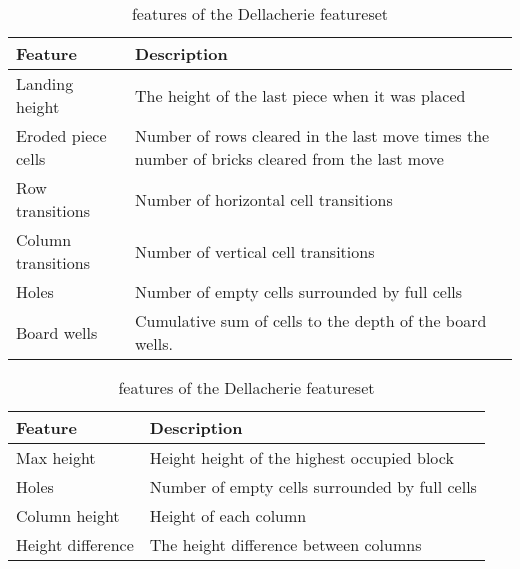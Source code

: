 \begin{table}[h!]
\begin{center}
\begin{tabular}{| l | p{8cm} |}
\hline
\textbf{Feature} & \textbf{Description}\\
\hline
Landing height & The height of the last piece when it was placed\\
\hline
Eroded piece cells & Number of rows cleared in the last move
times the number of bricks cleared from the last move\\
\hline
Row transitions & Number of horizontal cell transitions\\
\hline
Column transitions & Number of vertical cell transitions \\
\hline
Holes & Number of empty cells surrounded by full cells\\
\hline
Board wells & Cumulative sum of cells to the depth of
the board wells.\\
\hline
\end{tabular}
\end{center}
\caption{features of the Dellacherie featureset \label{table:dellfeat}}
\end{table}

\begin{table}[h!]
\begin{center}
\begin{tabular}{| l | p{8cm} |}
\hline
\textbf{Feature} & \textbf{Description}\\
\hline
Max height & Height height of the highest occupied block\\
\hline
Holes & Number of empty cells surrounded by full cells\\
\hline
Column height & Height of each column\\
\hline
Height difference & The height difference between columns\\
\hline
\end{tabular}
\end{center}
\caption{features of the Dellacherie featureset \label{table:bertfeat}}
\end{table}


